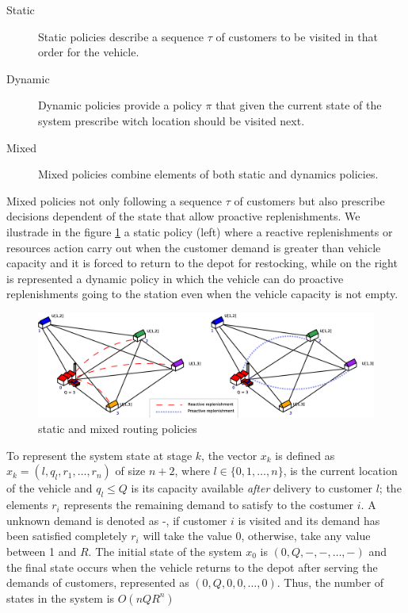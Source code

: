 \begin{description}
  \item[Static] Static policies describe a sequence $\tau$ of customers to be visited in that order for the vehicle.
  \item[Dynamic] Dynamic policies provide a policy $\pi$ that given the current state of the system prescribe witch location should be visited next.
  \item[Mixed] Mixed policies combine elements of both static and dynamics policies.
\end{description}

Mixed policies not only following a sequence $\tau$ of customers but also prescribe decisions dependent of the state that allow proactive replenishments. We ilustrade in the figure \ref{fig:routing_policies} a static policy (left) where a reactive replenishments or resources action carry out when the customer demand is greater than vehicle capacity and it is forced to return to the depot for restocking, while on the right is represented a dynamic policy in which the vehicle can do proactive replenishments going to the station even when the vehicle capacity is not empty.

\begin{figure}[!htbp]
  \begin{center}
   \includegraphics[width=1\textwidth]{Images/Chapter2/exIns4a.eps}
  \end{center}
    \caption{static and mixed routing policies}\label{fig:routing_policies}
\end{figure}

To represent the system state at stage $k$, the vector $x_k$ is defined as $x_k=(l,q_l, r_1,\ldots,r_n)$ of size $n+2$, where $l \in \{0,1,\ldots,n\}$, is the current location of the vehicle and $q_l \leq Q$ is its capacity available \textit{after} delivery to customer $l$; the elements $r_i$ represents the remaining demand to satisfy to the costumer $i$. A unknown demand is denoted as -, if customer $i$ is visited and its demand has been satisfied completely $r_i$ will take the value 0, otherwise, take any value between 1 and $R$. The initial state of the system $x_0$ is $(0,Q,-,-,\ldots,-)$ and the final state occurs when the vehicle returns to the depot after serving the demands of customers, represented as $(0,Q,0,0,\ldots,0)$. Thus, the number of states in the system is $O(nQR^n)$

